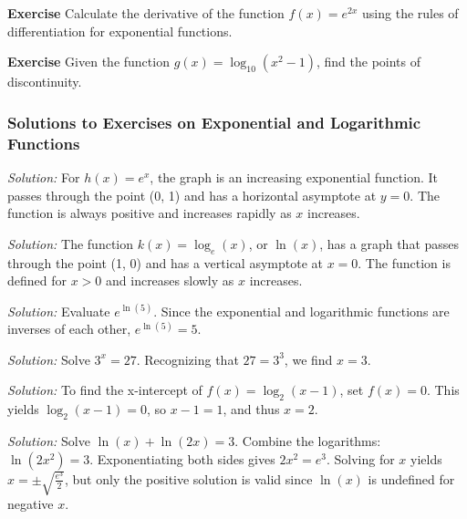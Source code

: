\documentclass[a4paper,12pt]{book}
\newenvironment{exercise}[1][]
  {\par\medskip\noindent\textbf{Exercise #1} \rmfamily}
  {\medskip}
\newenvironment{solution}[1][]
{\par\noindent\textit{Solution:} \rmfamily}{\medskip}
\begin{document}
\begin{exercise}
Calculate the derivative of the function \( f(x) = e^{2x} \) using the rules of differentiation for exponential functions.
\end{exercise}

\begin{exercise}
Given the function \( g(x) = \log_{10}(x^2 - 1) \), find the points of discontinuity.
\end{exercise}

\subsubsection*{Solutions to Exercises on Exponential and Logarithmic Functions}

\begin{solution}[1]
For \( h(x) = e^x \), the graph is an increasing exponential function. It passes through the point (0, 1) and has a horizontal asymptote at \( y = 0 \). The function is always positive and increases rapidly as \( x \) increases.
\end{solution}

\begin{solution}[2]
The function \( k(x) = \log_e(x) \), or \( \ln(x) \), has a graph that passes through the point (1, 0) and has a vertical asymptote at \( x = 0 \). The function is defined for \( x > 0 \) and increases slowly as \( x \) increases.
\end{solution}

\begin{solution}[3]
Evaluate \( e^{\ln(5)} \). Since the exponential and logarithmic functions are inverses of each other, \( e^{\ln(5)} = 5 \).
\end{solution}

\begin{solution}[4]
Solve \( 3^x = 27 \). Recognizing that \( 27 = 3^3 \), we find \( x = 3 \).
\end{solution}

\begin{solution}[5]
To find the x-intercept of \( f(x) = \log_2(x - 1) \), set \( f(x) = 0 \). This yields \( \log_2(x - 1) = 0 \), so \( x - 1 = 1 \), and thus \( x = 2 \).
\end{solution}

\begin{solution}[6]
Solve \( \ln(x) + \ln(2x) = 3 \). Combine the logarithms: \( \ln(2x^2) = 3 \). Exponentiating both sides gives \( 2x^2 = e^3 \). Solving for \( x \) yields \( x = \pm \sqrt{\frac{e^3}{2}} \), but only the positive solution is valid since \( \ln(x) \) is undefined for negative \( x \).
\end{solution}
\end{document}

